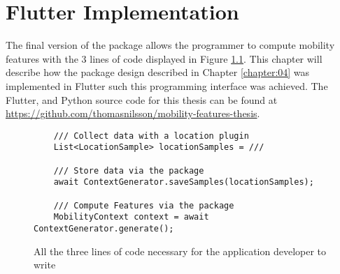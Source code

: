 \chapter{Flutter Implementation}
\label{chapter:05}
The final version of the package allows the programmer to compute mobility features with the 3 lines of code displayed in Figure \ref{fig:code-example-intro}. This chapter will describe how the package design described in Chapter \ref{chapter:04} was implemented in Flutter such this programming interface was achieved. The Flutter, and Python source code for this thesis can be found at \url{https://github.com/thomasnilsson/mobility-features-thesis}.

\begin{figure}[h]
    \centering
    \begin{verbatim}
    /// Collect data with a location plugin
    List<LocationSample> locationSamples = ///

    /// Store data via the package
    await ContextGenerator.saveSamples(locationSamples);
    
    /// Compute Features via the package
    MobilityContext context = await ContextGenerator.generate();
    \end{verbatim}
    \caption{All the three lines of code necessary for the application developer to write}
    \label{fig:code-example-intro}
\end{figure}









